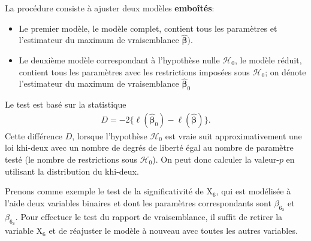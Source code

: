 \documentclass[
  11pt,
  letterpaper,
]{book}
\newenvironment{Shaded}{\begin{snugshade}}{\end{snugshade}}
\newcommand{\AttributeTok}[1]{\textcolor[rgb]{0.40,0.45,0.13}{#1}}
\newcommand{\CommentTok}[1]{\textcolor[rgb]{0.37,0.37,0.37}{#1}}
\newcommand{\ConstantTok}[1]{\textcolor[rgb]{0.56,0.35,0.01}{#1}}
\newcommand{\DecValTok}[1]{\textcolor[rgb]{0.68,0.00,0.00}{#1}}
\newcommand{\DocumentationTok}[1]{\textcolor[rgb]{0.37,0.37,0.37}{\textit{#1}}}
\newcommand{\FunctionTok}[1]{\textcolor[rgb]{0.28,0.35,0.67}{#1}}
\newcommand{\NormalTok}[1]{\textcolor[rgb]{0.00,0.23,0.31}{#1}}
\newcommand{\OtherTok}[1]{\textcolor[rgb]{0.00,0.23,0.31}{#1}}
\newcommand{\SpecialCharTok}[1]{\textcolor[rgb]{0.37,0.37,0.37}{#1}}
\newcommand{\StringTok}[1]{\textcolor[rgb]{0.13,0.47,0.30}{#1}}
\providecommand{\tightlist}{%
  \setlength{\itemsep}{0pt}\setlength{\parskip}{0pt}}\usepackage{longtable,booktabs,array}
\theoremstyle{definition}
\theoremstyle{remark}
\begin{document}
La procédure consiste à ajuster deux modèles \textbf{emboîtés}:

\begin{itemize}
\tightlist
\item
  Le premier modèle, le modèle complet, contient tous les paramètres et
  l'estimateur du maximum de vraisemblance
  \(\widehat{\boldsymbol{\beta}})\).
\item
  Le deuxième modèle correspondant à l'hypothèse nulle
  \(\mathscr{H}_0\), le modèle réduit, contient tous les paramètres avec
  les restrictions imposées sous \(\mathscr{H}_0\); on dénote
  l'estimateur du maximum de vraisemblance
  \(\widehat{\boldsymbol{\beta}}_0\)
\end{itemize}

Le test est basé sur la statistique \begin{align*}
 D = -2\{\ell(\widehat{\boldsymbol{\beta}}_0)-\ell(\widehat{\boldsymbol{\beta}})\}.
\end{align*} Cette différence \(D\), lorsque l'hypothèse
\(\mathscr{H}_0\) est vraie suit approximativement une loi khi-deux avec
un nombre de degrés de liberté égal au nombre de paramètre testé (le
nombre de restrictions sous \(\mathscr{H}_0\)). On peut donc calculer la
valeur-\(p\) en utilisant la distribution du khi-deux.

Prenons comme exemple le test de la significativité de \(\mathrm{X}_6\),
qui est modélisée à l'aide deux variables binaires et dont les
paramètres correspondants sont \(\beta_{6_{\texttt{2}}}\) et
\(\beta_{6_{\texttt{3}}}\). Pour effectuer le test du rapport de
vraisemblance, il suffit de retirer la variable \(\mathrm{X}_6\) et de
réajuster le modèle à nouveau avec toutes les autres variables.

\begin{Shaded}
\end{Shaded}
\end{document}
